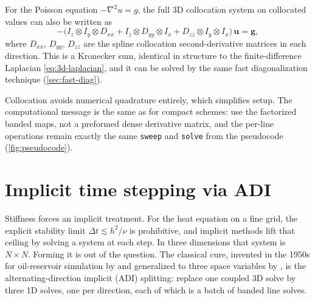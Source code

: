 \documentclass[11pt]{article}
\newcommand{\kron}{\otimes}
\newcommand{\Dxx}{D_{xx}}
\newcommand{\Dyy}{D_{yy}}
\newcommand{\Dzz}{D_{zz}}
\newcommand{\Ix}{I_{x}}
\newcommand{\Iy}{I_{y}}
\newcommand{\Iz}{I_{z}}
\newcommand{\dt}{\Delta t}
\newcommand{\Nall}{N}
\begin{document}
For the Poisson equation $-\nabla^2 u = g$, the full 3D collocation
system on collocated values can also be written as
\begin{equation}
  -\bigl(\Iz \kron \Iy \kron \Dxx
       + \Iz \kron \Dyy \kron \Ix
       + \Dzz \kron \Iy \kron \Ix\bigr)\,\bm{u}
  = \bm{g},
\end{equation}
where $\Dxx$, $\Dyy$, $\Dzz$ are the spline collocation
second-derivative matrices in each direction.  This is a Kronecker
sum, identical in structure to the finite-difference Laplacian
\eqref{eq:3d-laplacian}, and it can be solved by the same fast
diagonalization technique (\cref{sec:fast-diag}).

Collocation avoids numerical quadrature entirely, which simplifies
setup.  The computational message is the same as for compact
schemes: use the factorized banded maps, not a preformed dense
derivative matrix, and the per-line operations remain exactly the same
\texttt{sweep} and \texttt{solve} from the pseudocode
(\cref{fig:pseudocode}).


\section{Implicit time stepping via ADI}
\label{sec:implicit}

Stiffness forces an implicit treatment.  For the heat equation on a
fine grid, the explicit stability limit $\dt \lesssim h^2/\nu$ is
prohibitive, and implicit methods lift that ceiling by solving a
system at each step.  In three dimensions that system is
$\Nall \times \Nall$.  Forming it is out of the question.  The
classical cure, invented in the 1950s for oil-reservoir simulation by
\citet{peaceman1955numerical} and generalized to three space variables
by \citet{douglas1962alternating,douglas1964numerical}, is the
alternating-direction implicit (ADI) splitting: replace one coupled 3D
solve by three 1D solves, one per direction, each of which is a batch
of banded line solves.
\end{document}

